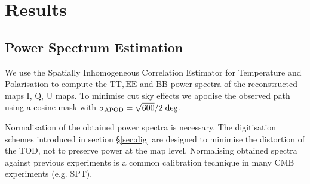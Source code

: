 \documentclass[apj]{emulateapj}
\begin{document}
\section{Results}
\label{sec:results}

\subsection{Power Spectrum Estimation}
\label{subsec:psestimation}

We use the Spatially Inhomogeneous Correlation Estimator for Temperature and Polarisation \citep[PolSpice;][]{polspice} to compute the $\mathrm{TT}, \mathrm{EE}$ and $\mathrm{BB}$ power spectra of the reconstructed maps I, Q, U maps. To minimise cut sky effects we apodise the observed path using a cosine mask with $\sigma_{\mathrm{APOD}} = \sqrt{600}/2 \hspace{0.7ex} \mathrm{deg}$. %



%



Normalisation of the obtained power spectra is necessary. The digitisation schemes introduced in section \S\ref{sec:dig} are designed to minimise the distortion of the TOD, not to preserve power at the map level. Normalising obtained spectra against previous experiments is a common calibration technique in many CMB experiments (e.g. SPT). %
\end{document}
